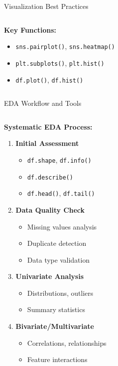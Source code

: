 \documentclass[8pt,aspectratio=1610]{beamer}
\begin{document}
\begin{frame}{Visualization Best Practices}
\begin{columns}[t]
\begin{column}{0.48\textwidth}
\textbf{Key Functions:}
\begin{itemize}
\setlength{\itemsep}{1pt}
\item \texttt{sns.pairplot()}, \texttt{sns.heatmap()}
\item \texttt{plt.subplots()}, \texttt{plt.hist()}
\item \texttt{df.plot()}, \texttt{df.hist()}
\end{itemize}
\end{column}
\end{columns}
\end{frame}

\begin{frame}{EDA Workflow and Tools}
\begin{columns}[t]
\begin{column}{0.48\textwidth}
\textbf{Systematic EDA Process:}
\begin{enumerate}
\setlength{\itemsep}{1pt}
\item \textbf{Initial Assessment}
   \begin{itemize}
   \item \texttt{df.shape}, \texttt{df.info()}
   \item \texttt{df.describe()}
   \item \texttt{df.head()}, \texttt{df.tail()}
   \end{itemize}
\item \textbf{Data Quality Check}
   \begin{itemize}
   \item Missing values analysis
   \item Duplicate detection
   \item Data type validation
   \end{itemize}
\item \textbf{Univariate Analysis}
   \begin{itemize}
   \item Distributions, outliers
   \item Summary statistics
   \end{itemize}
\item \textbf{Bivariate/Multivariate}
   \begin{itemize}
   \item Correlations, relationships
   \item Feature interactions
   \end{itemize}
\end{enumerate}
\end{column}


\end{columns}
\end{frame}
\end{document}
